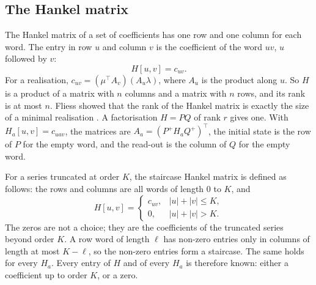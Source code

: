 \documentclass[11pt,a4paper]{article}
\theoremstyle{remark}
\begin{document}
\subsection{The Hankel matrix}
The Hankel matrix of a set of coefficients has one row and one column for each word.
The entry in row $u$ and column $v$ is the coefficient of the word $uv$, $u$ followed by $v$:
\begin{equation}
H[u,v]=c_{uv}.
\end{equation}
For a realisation, $c_{uv}=(\mu^\top A_v)(A_u\lambda)$, where $A_u$ is the product along $u$.
So $H$ is a product of a matrix with $n$ columns and a matrix with $n$ rows, and its rank is at most $n$.
Fliess showed that the rank of the Hankel matrix is exactly the size of a minimal realisation \cite{Fliess1974}.
A factorisation $H=PQ$ of rank $r$ gives one.
With $H_a[u,v]=c_{uav}$, the matrices are $A_a=(P^+H_aQ^+)^\top$, the initial state is the row of $P$ for the empty word, and the read-out is the column of $Q$ for the empty word.

For a series truncated at order $K$, the staircase Hankel matrix is defined as follows: the rows and columns are all words of length $0$ to $K$, and
\begin{equation}
H[u,v]=\begin{cases} c_{uv}, & |u|+|v|\le K,\\ 0, & |u|+|v|>K.\end{cases}
\end{equation}
The zeros are not a choice; they are the coefficients of the truncated series beyond order $K$.
A row word of length $\ell$ has non-zero entries only in columns of length at most $K-\ell$, so the non-zero entries form a staircase.
The same holds for every $H_a$.
Every entry of $H$ and of every $H_a$ is therefore known: either a coefficient up to order $K$, or a zero.
\end{document}

